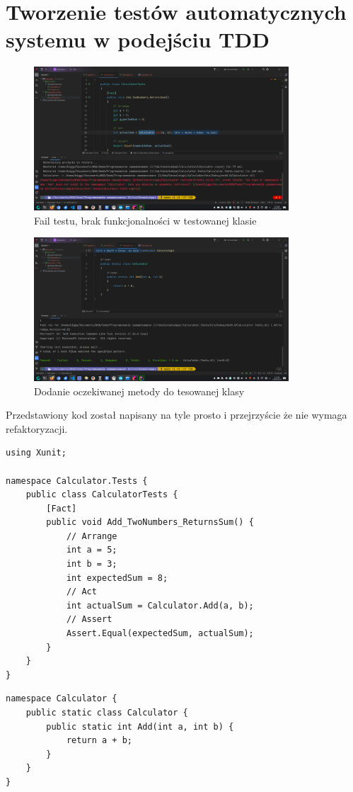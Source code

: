 \documentclass[12pt]{article}
\begin{document}
\section{Tworzenie testów automatycznych systemu w podejściu TDD}
\begin{figure}[H]
  \centering
  \includegraphics[width=0.85\textwidth,keepaspectratio]{image-20.png}
  \caption{Fail testu, brak funkcjonalności w testowanej klasie}
  \label{fig:image-20}
\end{figure}
\begin{figure}[H]
  \centering
  \includegraphics[width=0.85\textwidth,keepaspectratio]{image-21.png}
  \caption{Dodanie oczekiwanej metody do tesowanej klasy}
  \label{fig:image-21}
\end{figure}
Przedstawiony kod został napisany na tyle prosto i przejrzyście że nie wymaga refaktoryzacji.
\begin{verbatim}
using Xunit;

namespace Calculator.Tests {
    public class CalculatorTests {
        [Fact]
        public void Add_TwoNumbers_ReturnsSum() {
            // Arrange
            int a = 5;
            int b = 3;
            int expectedSum = 8;
            // Act
            int actualSum = Calculator.Add(a, b);
            // Assert
            Assert.Equal(expectedSum, actualSum);
        }
    }
}
\end{verbatim}
\begin{verbatim}
namespace Calculator {
    public static class Calculator {
        public static int Add(int a, int b) {
            return a + b;
        }
    }
}
\end{verbatim}
\pagebreak
\end{document}
